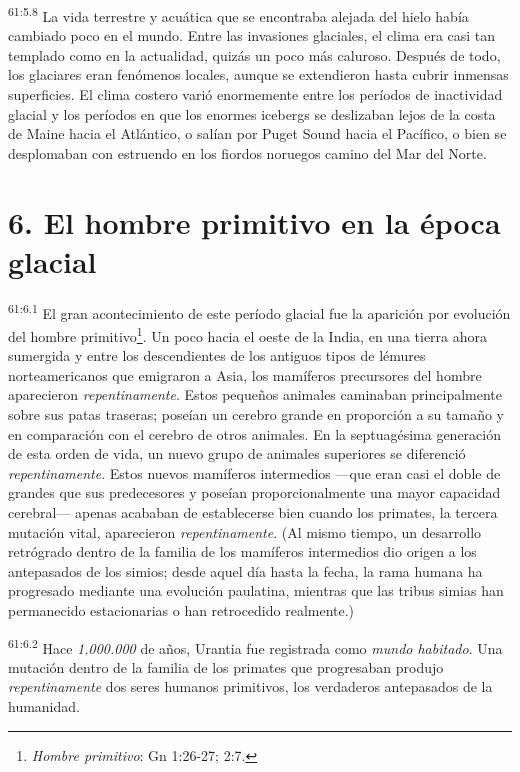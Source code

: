\par
\textsuperscript{61:5.8} La vida terrestre y acuática que se encontraba alejada del hielo había cambiado poco en el mundo. Entre las invasiones glaciales, el clima era casi tan templado como en la actualidad, quizás un poco más caluroso. Después de todo, los glaciares eran fenómenos locales, aunque se extendieron hasta cubrir inmensas superficies. El clima costero varió enormemente entre los períodos de inactividad glacial y los períodos en que los enormes icebergs se deslizaban lejos de la costa de Maine hacia el Atlántico, o salían por Puget Sound hacia el Pacífico, o bien se desplomaban con estruendo en los fiordos noruegos camino del Mar del Norte.

\section*{6. El hombre primitivo en la época glacial}
\par
\textsuperscript{61:6.1} El gran acontecimiento de este período glacial fue la aparición por evolución del hombre primitivo\footnote{\textit{Hombre primitivo}: Gn 1:26-27; 2:7.}. Un poco hacia el oeste de la India, en una tierra ahora sumergida y entre los descendientes de los antiguos tipos de lémures norteamericanos que emigraron a Asia, los mamíferos precursores del hombre aparecieron \textit{repentinamente}. Estos pequeños animales caminaban principalmente sobre sus patas traseras; poseían un cerebro grande en proporción a su tamaño y en comparación con el cerebro de otros animales. En la septuagésima generación de esta orden de vida, un nuevo grupo de animales superiores se diferenció \textit{repentinamente}. Estos nuevos mamíferos intermedios ---que eran casi el doble de grandes que sus predecesores y poseían proporcionalmente una mayor capacidad cerebral--- apenas acababan de establecerse bien cuando los primates, la tercera mutación vital, aparecieron \textit{repentinamente}. (Al mismo tiempo, un desarrollo retrógrado dentro de la familia de los mamíferos intermedios dio origen a los antepasados de los simios; desde aquel día hasta la fecha, la rama humana ha progresado mediante una evolución paulatina, mientras que las tribus simias han permanecido estacionarias o han retrocedido realmente.)

\par
\textsuperscript{61:6.2} Hace \textit{1.000.000} de años, Urantia fue registrada como \textit{mundo habitado}. Una mutación dentro de la familia de los primates que progresaban produjo \textit{repentinamente} dos seres humanos primitivos, los verdaderos antepasados de la humanidad.


